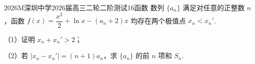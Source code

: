 
\begin{problem}{2026}{M}{深圳中学2026届高三二轮二阶测试}{16}{函数}
数列 $\{a_n\}$ 满足对任意的正整数 $n$，函数 $f(x)=\dfrac{x^2}{2}+\ln x-(a_n+2)x$ 均存在两个极值点 $x_n<x_n'$.

（1）证明 $x_n+x_n'>2$；

（2）若 $\left|x_n-x_n'\right|=(n+1)a_n$，求 $\{a_n\}$ 的前 $n$ 项和 $S_n$.
\end{problem}
